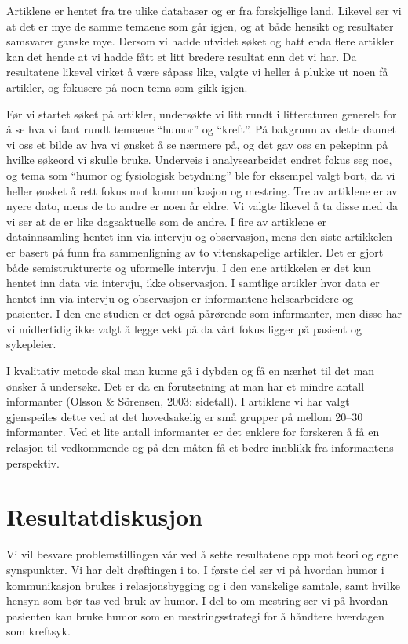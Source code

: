 Artiklene er hentet fra tre ulike databaser og er fra forskjellige land.
Likevel ser vi at det er mye de samme temaene som går igjen, og at både hensikt
og resultater samsvarer ganske mye. Dersom vi hadde utvidet søket og hatt enda
flere artikler kan det hende at vi hadde fått et litt bredere resultat enn det
vi har. Da resultatene likevel virket å være såpass like, valgte vi heller å
plukke ut noen få artikler, og fokusere på noen tema som gikk igjen.

Før vi startet søket på artikler, undersøkte vi litt rundt i litteraturen
generelt for å se hva vi fant rundt temaene “humor” og “kreft”. På bakgrunn av
dette dannet vi oss et bilde av hva vi ønsket å se nærmere på, og det gav oss
en pekepinn på hvilke søkeord vi skulle bruke. Underveis i analysearbeidet
endret fokus seg noe, og tema som “humor og fysiologisk betydning” ble for
eksempel valgt bort, da vi heller ønsket å rett fokus mot kommunikasjon og
mestring.  Tre av artiklene er av nyere dato, mens de to andre er noen år
eldre. Vi valgte likevel å ta disse med da vi ser at de er like dagsaktuelle
som de andre.  I fire av artiklene er datainnsamling hentet inn via intervju og
observasjon, mens den siste artikkelen er basert på funn fra sammenligning av
to vitenskapelige artikler. Det er gjort både semistrukturerte og uformelle
intervju. I den ene artikkelen er det kun hentet inn data via intervju, ikke
observasjon. I samtlige artikler hvor data er hentet inn via intervju og
observasjon er informantene helsearbeidere og pasienter. I den ene studien er
det også pårørende som informanter, men disse har vi midlertidig ikke valgt å
legge vekt på da vårt fokus ligger på pasient og sykepleier.

I kvalitativ metode skal man kunne gå i dybden og få en nærhet til det man
ønsker å undersøke. Det er da en forutsetning at man har et mindre antall
informanter (Olsson \&{} Sörensen, 2003: sidetall). I artiklene vi har valgt
gjenspeiles dette ved at  det hovedsakelig er små grupper på mellom 20--30
informanter. Ved et lite antall informanter er det enklere for forskeren å få
en relasjon til vedkommende og på den måten få et bedre innblikk fra
informantens perspektiv.

\section{Resultatdiskusjon}

Vi vil besvare problemstillingen vår ved å sette resultatene opp mot teori og
egne synspunkter. Vi har delt drøftingen i to. I første del ser vi på hvordan
humor i kommunikasjon brukes i relasjonsbygging og i den vanskelige samtale,
samt hvilke hensyn som bør tas ved bruk av humor. I del to om mestring ser vi
på hvordan pasienten kan bruke humor som en mestringsstrategi for å håndtere
hverdagen som kreftsyk.

